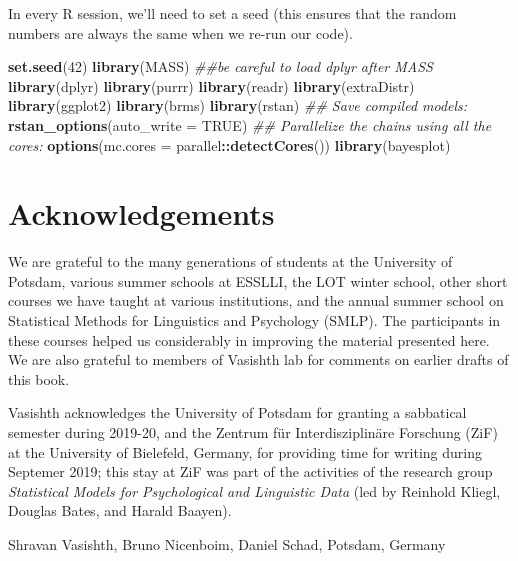 \documentclass[12pt,]{krantz}
\newenvironment{Shaded}{\begin{snugshade}}{\end{snugshade}}
\newcommand{\CommentTok}[1]{\textcolor[rgb]{0.56,0.35,0.01}{\textit{#1}}}
\newcommand{\DataTypeTok}[1]{\textcolor[rgb]{0.13,0.29,0.53}{#1}}
\newcommand{\DecValTok}[1]{\textcolor[rgb]{0.00,0.00,0.81}{#1}}
\newcommand{\KeywordTok}[1]{\textcolor[rgb]{0.13,0.29,0.53}{\textbf{#1}}}
\newcommand{\NormalTok}[1]{#1}
\newcommand{\OperatorTok}[1]{\textcolor[rgb]{0.81,0.36,0.00}{\textbf{#1}}}
\newcommand{\OtherTok}[1]{\textcolor[rgb]{0.56,0.35,0.01}{#1}}
\let\BeginKnitrBlock\begin \let\EndKnitrBlock\end
\begin{document}
In every R session, we'll need to set a seed (this ensures that the random numbers are always the same when we re-run our code).

\begin{Shaded}
\begin{Highlighting}[]
\KeywordTok{set.seed}\NormalTok{(}\DecValTok{42}\NormalTok{)}
\KeywordTok{library}\NormalTok{(MASS)}
\CommentTok{##be careful to load dplyr after MASS}
\KeywordTok{library}\NormalTok{(dplyr)}
\KeywordTok{library}\NormalTok{(purrr)}
\KeywordTok{library}\NormalTok{(readr)}
\KeywordTok{library}\NormalTok{(extraDistr)}
\KeywordTok{library}\NormalTok{(ggplot2)}
\KeywordTok{library}\NormalTok{(brms)}
\KeywordTok{library}\NormalTok{(rstan)}
\CommentTok{## Save compiled models:}
\KeywordTok{rstan_options}\NormalTok{(}\DataTypeTok{auto_write =} \OtherTok{TRUE}\NormalTok{)}
\CommentTok{## Parallelize the chains using all the cores:}
\KeywordTok{options}\NormalTok{(}\DataTypeTok{mc.cores =}\NormalTok{ parallel}\OperatorTok{::}\KeywordTok{detectCores}\NormalTok{())}
\KeywordTok{library}\NormalTok{(bayesplot)}
\end{Highlighting}
\end{Shaded}

\hypertarget{acknowledgements}{%
\section{Acknowledgements}\label{acknowledgements}}

We are grateful to the many generations of students at the University of Potsdam, various summer schools at ESSLLI, the LOT winter school, other short courses we have taught at various institutions, and the annual summer school on Statistical Methods for Linguistics and Psychology (SMLP). The participants in these courses helped us considerably in improving the material presented here. We are also grateful to members of Vasishth lab for comments on earlier drafts of this book.

Vasishth acknowledges the University of Potsdam for granting a sabbatical semester during 2019-20, and the Zentrum für Interdisziplinäre Forschung (ZiF) at the University of Bielefeld, Germany, for providing time for writing during Septemer 2019; this stay at ZiF was part of the activities of the research group \emph{Statistical Models for Psychological and Linguistic Data} (led by Reinhold Kliegl, Douglas Bates, and Harald Baayen).

\BeginKnitrBlock{flushright}
Shravan Vasishth,
Bruno Nicenboim,
Daniel Schad,
Potsdam, Germany
\EndKnitrBlock{flushright}
\end{document}

